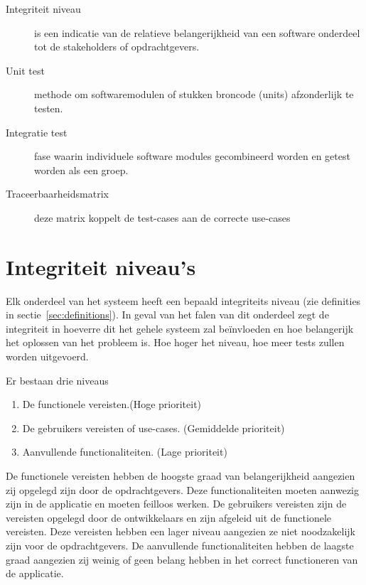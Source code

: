 \documentclass[a4paper]{article}
\begin{document}
\begin{description}

\item[Integriteit niveau] is een indicatie van de relatieve belangerijkheid van een software onderdeel tot de stakeholders of opdrachtgevers.
\item[Unit test] methode om softwaremodulen of stukken broncode (units) afzonderlijk te testen.
\item [Integratie test] fase waarin individuele software modules gecombineerd worden en getest worden als een groep.

\item [Traceerbaarheidsmatrix] deze matrix koppelt de test-cases aan de correcte use-cases


\end{description}


\section{Integriteit niveau's}

Elk onderdeel van het systeem heeft een bepaald integriteits niveau (zie definities in sectie~\ref{sec:definitions}). In geval van het falen van dit onderdeel zegt de integriteit in hoeverre dit het gehele systeem zal beïnvloeden en hoe belangerijk het oplossen van het probleem is. Hoe hoger het niveau, hoe meer tests zullen worden uitgevoerd.

Er bestaan drie niveaus

\begin{enumerate}

\item De functionele vereisten.(Hoge prioriteit)

\item De gebruikers vereisten of use-cases. (Gemiddelde prioriteit) 

\item Aanvullende functionaliteiten. (Lage prioriteit)

\end{enumerate}

De functionele vereisten hebben de hoogste graad van belangerijkheid aangezien zij opgelegd zijn door de opdrachtgevers. Deze functionaliteiten moeten aanwezig zijn in de applicatie en moeten feilloos werken.
De gebruikers vereisten zijn de vereisten opgelegd door de ontwikkelaars en zijn afgeleid uit de functionele vereisten. Deze vereisten hebben een lager niveau aangezien ze niet noodzakelijk zijn voor de opdrachtgevers.
De aanvullende functionaliteiten hebben de laagste graad aangezien zij weinig of geen belang hebben in het correct functioneren van de applicatie.
\end{document}
